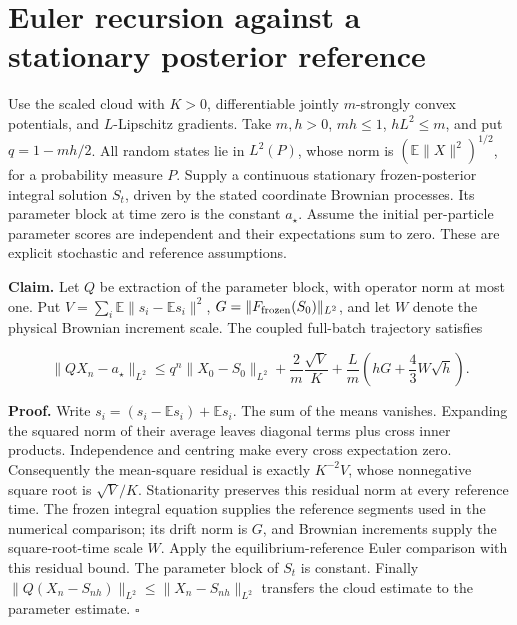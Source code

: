 \documentclass[11pt,a4paper]{report}
\begin{document}
\section{\texorpdfstring{Euler recursion against a stationary posterior reference}{Euler recursion against a stationary posterior reference}}


Use the scaled cloud with \(K>0\), differentiable jointly \(m\)-strongly convex potentials, and \(L\)-Lipschitz gradients. Take \(m,h>0\), \(mh\le1\), \(hL^2\le m\), and put \(q=1-mh/2\). All random states lie in \(L^2(P)\), whose norm is \((\mathbb E\|X\|^2)^{1/2}\), for a probability measure \(P\). Supply a continuous stationary frozen-posterior integral solution \(S_t\), driven by the stated coordinate Brownian processes. Its parameter block at time zero is the constant \(a_\star\). Assume the initial per-particle parameter scores are independent and their expectations sum to zero. These are explicit stochastic and reference assumptions.



\textbf{Claim.} Let \(Q\) be extraction of the parameter block, with operator norm at most one. Put \(V=\sum_i\mathbb E\|s_i-\mathbb Es_i\|^2\), \(G=\|F_{\rm frozen}(S_0)\|_{L^2}\), and let \(W\) denote the physical Brownian increment scale. The coupled full-batch trajectory satisfies

\[\|QX_n-a_\star\|_{L^2}\le q^n\|X_0-S_0\|_{L^2}+\frac2m\frac{\sqrt V}{K}+\frac Lm\left(hG+\frac43W\sqrt h\right).\]

\textbf{Proof.} Write \(s_i=(s_i-\mathbb Es_i)+\mathbb Es_i\). The sum of the means vanishes. Expanding the squared norm of their average leaves diagonal terms plus cross inner products. Independence and centring make every cross expectation zero. Consequently the mean-square residual is exactly \(K^{-2}V\), whose nonnegative square root is \(\sqrt V/K\). Stationarity preserves this residual norm at every reference time. The frozen integral equation supplies the reference segments used in the numerical comparison; its drift norm is \(G\), and Brownian increments supply the square-root-time scale \(W\). Apply the equilibrium-reference Euler comparison with this residual bound. The parameter block of \(S_t\) is constant. Finally \(\|Q(X_n-S_{nh})\|_{L^2}\le\|X_n-S_{nh}\|_{L^2}\) transfers the cloud estimate to the parameter estimate. \(\square\)
\end{document}
